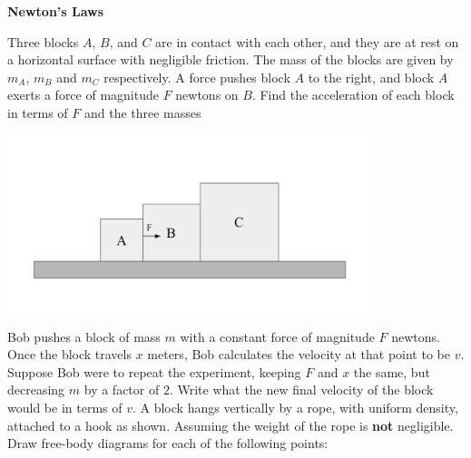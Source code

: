 \documentclass{exam}
\begin{document}
    \vspace*{-25px}
    \begin{center}
        \huge \textbf{Newton's Laws}
    \end{center}
    \vspace*{0.05in}
    
    \begin{questions}
        \large
        \question Three blocks $A$, $B$, and $C$ are in contact with each other, 
        and they are at rest on a horizontal surface with negligible 
        friction. The mass of the blocks are given by $m_A$, $m_B$ and 
        $m_C$ respectively. A force pushes block $A$ to the right, and block $A$ exerts a force of magnitude $F$ newtons on $B$. 
        Find the acceleration of each block in terms of $F$ and the three masses\\
        \begin{center}\includegraphics[width=400px]{../assets/blocks.png}\end{center}
        \vspace*{1.4in}
        \question Bob pushes a block of mass $m$ with a constant force of magnitude $F$ newtons. Once the block travels $x$ meters, Bob calculates the velocity at that point to be $v$.
        Suppose Bob were to repeat the experiment, keeping $F$ and $x$ the same, but decreasing $m$ by a factor of $2$. Write what the new final velocity of the block would be in terms of $v$.
        \vspace*{2in}
        \question A block hangs vertically by a rope, with uniform density, attached to a hook as shown. Assuming the weight of the rope is \textbf{not} negligible. Draw free-body diagrams for each of the following points:
\end{questions}
\end{document}

